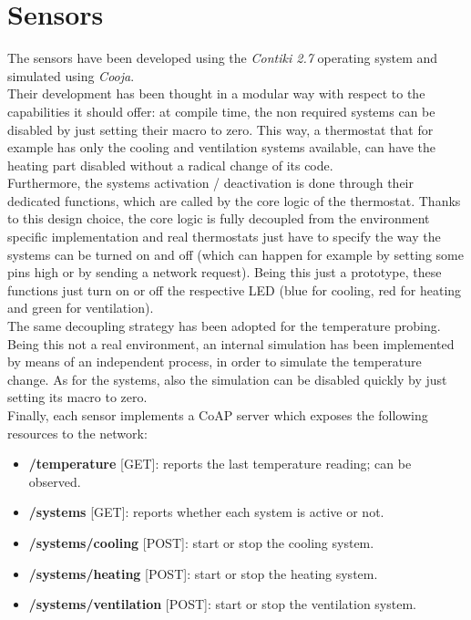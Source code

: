 \documentclass[12pt,a4paper]{report}
\begin{document}
\section*{Sensors}
The sensors have been developed using the \textit{Contiki 2.7} operating system and simulated using \textit{Cooja}.\\[8 pt]
Their development has been thought in a modular way with respect to the capabilities it should offer: at compile time, the non required systems can be disabled by just setting their macro to zero. This way, a thermostat that for example has only the cooling and ventilation systems available, can have the heating part disabled without a radical change of its code.\\[8 pt]
Furthermore, the systems activation / deactivation is done through their dedicated functions, which are called by the core logic of the thermostat. Thanks to this design choice, the core logic is fully decoupled from the environment specific implementation and real thermostats just have to specify the way the systems can be turned on and off (which can happen for example by setting some pins high or by sending a network request). Being this just a prototype, these functions just turn on or off the respective LED (blue for cooling, red for heating and green for ventilation).\\[8 pt]
The same decoupling strategy has been adopted for the temperature probing. Being this not a real environment, an internal simulation has been implemented by means of an independent process, in order to simulate the temperature change. As for the systems, also the simulation can be disabled quickly by just setting its macro to zero.\\[8 pt]
Finally, each sensor implements a CoAP server which exposes the following resources to the network:
\begin{itemize}
    \item \textbf{/temperature} [GET]: reports the last temperature reading; can be observed.
    \item \textbf{/systems} [GET]: reports whether each system is active or not.
    \item \textbf{/systems/cooling} [POST]: start or stop the cooling system.
    \item \textbf{/systems/heating} [POST]: start or stop the heating system.
    \item \textbf{/systems/ventilation} [POST]: start or stop the ventilation system.
\end{itemize}
\end{document}
